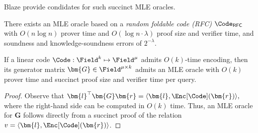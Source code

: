 Blaze provide condidates for such succinct MLE oracles.
\begin{lemma}
\label{lemma:oracleMLPCBaseFold}
There exists an MLE oracle based on a \emph{random foldable code (RFC)}
$\Code_{\mathsf{RFC}}$~\cite[Definition~9]{crypto/ZeilbergerCF24}
with $O(n\log n)$ prover time and
$O(\log n \cdot \lambda)$ proof size and verifier time,
and soundness and knowledge-soundness errors of $2^{-\lambda}$.
\end{lemma}

\begin{lemma}
\label{lemma:mleGenerator}
If a linear code $\Code: \Field^{k} \mapsto \Field^{\mu}$ admits $O(k)$-time
encoding, then its generator matrix $\bm{G} \in \Field^{\mu \times k}$
admits an MLE oracle with $O(k)$ prover time and succinct proof
size and verifier time per query.
\end{lemma}

\begin{proof}
Observe that
\(
    \bm{l}^\top \bm{G} \bm{r}
    = \langle \bm{l}, \Enc[\Code](\bm{r}) \rangle,
\)
where the right-hand side can be computed in $O(k)$ time.
Thus, an MLE oracle for $\bm{G}$ follows directly from a succinct proof of
the relation $v = \langle \bm{l}, \Enc[\Code](\bm{r}) \rangle$.
\end{proof}

